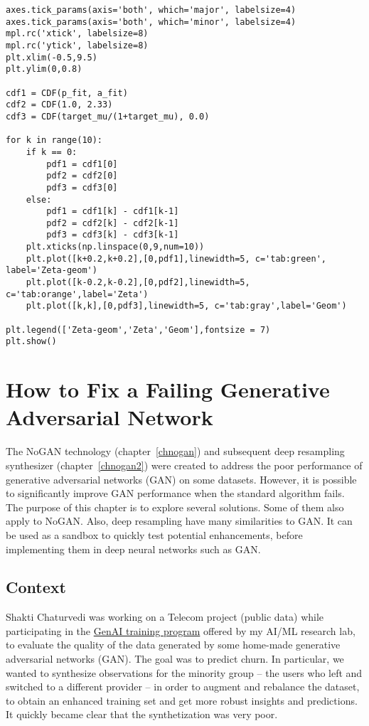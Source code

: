 \documentclass[oneside,10pt]{book}
\begin{document}
\begin{lstlisting}
axes.tick_params(axis='both', which='major', labelsize=4)
axes.tick_params(axis='both', which='minor', labelsize=4)
mpl.rc('xtick', labelsize=8)
mpl.rc('ytick', labelsize=8)
plt.xlim(-0.5,9.5)
plt.ylim(0,0.8)

cdf1 = CDF(p_fit, a_fit)
cdf2 = CDF(1.0, 2.33)
cdf3 = CDF(target_mu/(1+target_mu), 0.0)

for k in range(10):
    if k == 0:
        pdf1 = cdf1[0]
        pdf2 = cdf2[0]
        pdf3 = cdf3[0]
    else:
        pdf1 = cdf1[k] - cdf1[k-1]
        pdf2 = cdf2[k] - cdf2[k-1]
        pdf3 = cdf3[k] - cdf3[k-1]
    plt.xticks(np.linspace(0,9,num=10))
    plt.plot([k+0.2,k+0.2],[0,pdf1],linewidth=5, c='tab:green', label='Zeta-geom')
    plt.plot([k-0.2,k-0.2],[0,pdf2],linewidth=5, c='tab:orange',label='Zeta')
    plt.plot([k,k],[0,pdf3],linewidth=5, c='tab:gray',label='Geom')

plt.legend(['Zeta-geom','Zeta','Geom'],fontsize = 7)
plt.show()
\end{lstlisting}


\chapter{How to Fix a Failing Generative Adversarial Network}\label{failinggan}

The NoGAN technology (chapter~\ref{chnogan}) and subsequent deep resampling synthesizer (chapter~\ref{chnogan2}) were created to address
 the poor performance of generative adversarial networks (GAN) on some datasets. However, it is possible to significantly improve GAN performance
 when the standard algorithm fails. The purpose of this chapter is to explore several solutions. Some of them also apply to NoGAN. Also, deep
 resampling have many similarities to GAN. It can be used as a sandbox to quickly test potential enhancements, before implementing them in
  deep neural networks such as GAN.


\section{Context}\label{context}

Shakti Chaturvedi was working on a Telecom project (public data)
 while participating in the \href{https://mltblog.com/3pWxvZK}{GenAI training program} offered by my AI/ML research lab, to evaluate the
 quality of the data generated by some home-made \textcolor{index}{generative adversarial networks} (GAN).
 The goal was to predict churn. In particular, we wanted to synthesize observations for the minority group -- the users who left and switched to
 a different provider -- in order to augment and rebalance the dataset, to obtain an enhanced training set and get more robust insights and predictions.
It quickly became clear that the synthetization was very poor.
\end{document}
